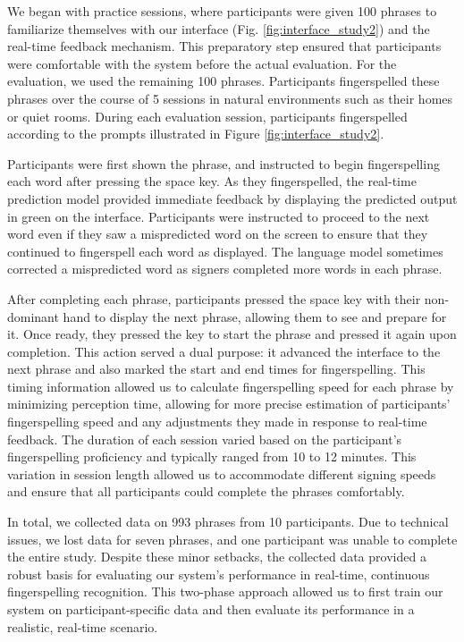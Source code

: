 We began with practice sessions, where participants were given 100 phrases to familiarize themselves with our interface (Fig. \ref{fig:interface_study2}) and the real-time feedback mechanism. This preparatory step ensured that participants were comfortable with the system before the actual evaluation. For the evaluation, we used the remaining 100 phrases. Participants fingerspelled these phrases over the course of 5 sessions in natural environments such as their homes or quiet rooms. During each evaluation session, participants fingerspelled according to the prompts illustrated in Figure \ref{fig:interface_study2}. 

Participants were first shown the phrase, and instructed to begin fingerspelling each word after pressing the space key. As they fingerspelled, the real-time prediction model provided immediate feedback by displaying the predicted output in green on the interface.  Participants were instructed to proceed to the next word even if they saw a mispredicted word on the screen to ensure that they continued to fingerspell each word as displayed. The language model sometimes corrected a mispredicted word as signers completed more words in each phrase.


After completing each phrase, participants pressed the space key with their non-dominant hand to display the next phrase, allowing them to see and prepare for it. Once ready, they pressed the key to start the phrase and pressed it again upon completion. This action served a dual purpose: it advanced the interface to the next phrase and also marked the start and end times for fingerspelling. This timing information allowed us to calculate fingerspelling speed for each phrase by minimizing perception time, allowing for more precise estimation of participants' fingerspelling speed and any adjustments they made in response to real-time feedback. The duration of each session varied based on the participant's fingerspelling proficiency and typically ranged from 10 to 12 minutes. This variation in session length allowed us to accommodate different signing speeds and ensure that all participants could complete the phrases comfortably.

In total, we collected data on 993 phrases from 10 participants. Due to technical issues, we lost data for seven phrases, and one participant was unable to complete the entire study. Despite these minor setbacks, the collected data provided a robust basis for evaluating our system's performance in real-time, continuous fingerspelling recognition. This two-phase approach allowed us to first train our system on participant-specific data and then evaluate its performance in a realistic, real-time scenario. 








